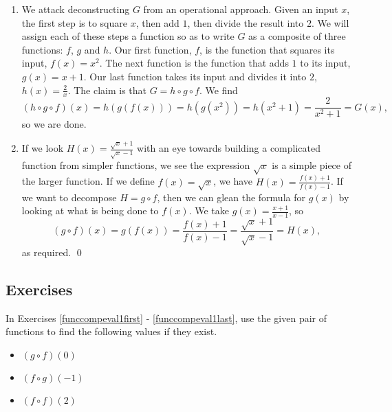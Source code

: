 \begin{ex}
\begin{enumerate}
\item  We attack deconstructing $G$ from an operational approach.  Given an input $x$, the first step is to square $x$, then add $1$, then divide the result into $2$.  We will assign each of these steps a function so as to write $G$ as a composite of three functions: $f$, $g$ and $h$.  Our first function, $f$, is the function that squares its input, $f(x) = x^2$.  The next function is the function that adds $1$ to its input, $g(x) = x+1$.  Our last function takes its input and divides it into $2$, $h(x) = \frac{2}{x}$.  The claim is that $G = h \circ g \circ f$. We find  \[(h \circ g \circ f)(x) = h(g(f(x))) = h(g\left(x^2\right)) = h\left(x^2+1\right)= \frac{2}{x^2+1} = G(x),\] so we are done.
\item  If we look $H(x) = \frac{\sqrt{x}+1}{\sqrt{x}-1}$ with an eye towards building a complicated function from simpler functions, we see the expression $\sqrt{x}$ is a simple piece of the larger function.  If we define $f(x) = \sqrt{x}$, we have $H(x) = \frac{f(x)+1}{f(x)-1}$.  If we want to decompose $H = g \circ f$, then we can glean the formula for $g(x)$ by looking at what is being done to $f(x)$.  We take $g(x) = \frac{x+1}{x-1}$, so \[(g \circ f)(x) = g(f(x)) = \frac{f(x)+1}{f(x)-1} = \frac{\sqrt{x}+1}{\sqrt{x}-1} = H(x),\] as required.  \qed

\end{enumerate}

\end{ex}

\newpage

\subsection{Exercises}

In Exercises \ref{funccompeval1first} - \ref{funccompeval1last}, use the given pair of functions to find the following values if they exist.

\begin{multicols}{3}

\begin{itemize}

\item  $(g\circ f)(0)$

\item  $(f\circ g)(-1)$

\item  $(f \circ f)(2)$

\end{itemize}

\end{multicols}

